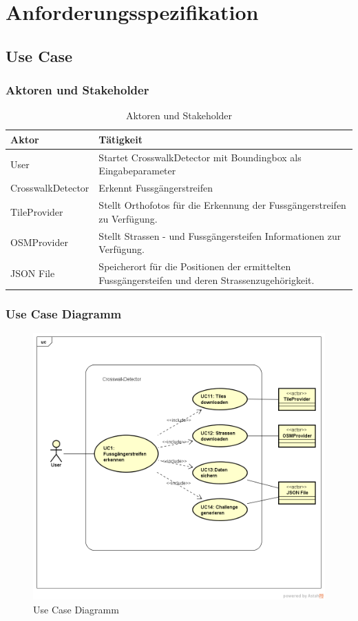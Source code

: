 \section{Anforderungsspezifikation}
\subsection{Use Case}
\subsubsection{Aktoren und Stakeholder}
\begin{table}[H]
\centering
    \begin{tabular}{|p{3cm}|p{9cm}|}
    \hline
    \rowcolor{lightblue}
    Aktor & Tätigkeit   \\ \hline
	User  & Startet CrosswalkDetector mit Boundingbox als Eingabeparameter \\ \hline
	CrosswalkDetector & Erkennt Fussgängerstreifen \\ \hline 
	TileProvider & Stellt Orthofotos für die Erkennung der Fussgängerstreifen zu Verfügung.\\ \hline
	OSMProvider & Stellt Strassen - und Fussgängersteifen Informationen zur Verfügung. \\ \hline
	JSON File & Speicherort für die Positionen der ermittelten Fussgängersteifen und deren Strassenzugehörigkeit.\\ \hline
    \end{tabular}
    \caption[Aktoren und Stakeholder]{Aktoren und Stakeholder}
\end{table}

\subsubsection{Use Case Diagramm}
\begin{figure}[H]
\centering
\includegraphics[width=420pt]{images/UseCase.png}
\caption[Use Case Diagramm]{Use Case Diagramm}
\end{figure}

